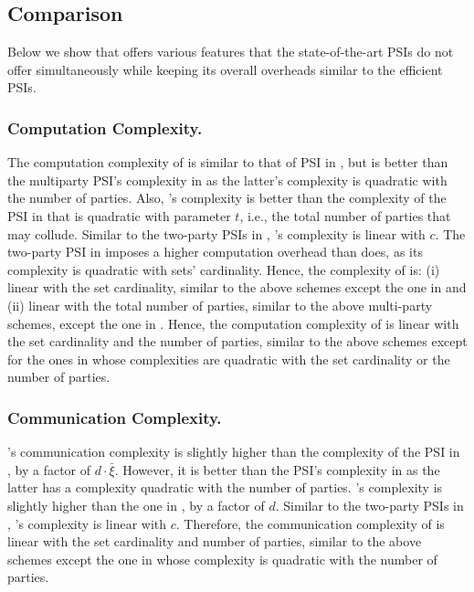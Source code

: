\subsection{Comparison}
Below we show that \epsi offers various features that the state-of-the-art PSIs do not offer simultaneously while keeping its overall overheads similar to the efficient PSIs.  

\subsubsection{Computation Complexity.} The  computation complexity  of \epsi is similar to that of PSI in \cite{AbadiDMT22}, but is better than the multiparty PSI's complexity in \cite{DBLP:conf/ccs/KolesnikovMPRT17} as  the latter's complexity is quadratic with the number of parties. Also, \epsi's complexity  is better than the complexity of the PSI in  \cite{NevoTY21}  that is quadratic with parameter $t$, i.e., the total number of parties that may collude. Similar to the two-party PSIs in \cite{DebnathD16,RaghuramanR22}, \epsi's complexity is linear with $c$.  The two-party PSI in \cite{DBLP:conf/dbsec/DongCCR13} imposes a higher computation overhead than \epsi does, as its complexity is quadratic with sets' cardinality. Hence, the complexity of \epsi is: (i) linear with the set cardinality, similar to the above schemes except the one in \cite{DBLP:conf/dbsec/DongCCR13} and (ii) linear with the total number of parties, similar to  the above multi-party schemes, except the one in \cite{DBLP:conf/ccs/KolesnikovMPRT17}. 
%
Hence, the computation complexity of \epsi is linear with the set cardinality and the number of parties, similar to the above schemes except for the ones in \cite{DBLP:conf/ccs/KolesnikovMPRT17,DBLP:conf/dbsec/DongCCR13} whose complexities are quadratic with the set cardinality or the number of parties. 


\subsubsection{Communication Complexity.}  \epsi's communication complexity is slightly higher than the complexity of the PSI in \cite{AbadiDMT22}, by a factor of $d\cdot \bar\xi$. However, it is better than the  PSI's complexity in \cite{DBLP:conf/ccs/KolesnikovMPRT17} as the latter has a complexity quadratic with the number of parties. \epsi's complexity is slightly higher than the one in \cite{NevoTY21}, by a factor of $d$. Similar to the two-party PSIs in  \cite{DebnathD16,RaghuramanR22,DBLP:conf/dbsec/DongCCR13}, \epsi's complexity is linear with $c$. 
%
Therefore, the communication complexity of \epsi is linear with the set cardinality and number of parties, similar to the above schemes except the one in \cite{DBLP:conf/ccs/KolesnikovMPRT17} whose complexity is quadratic with the number of parties. 


